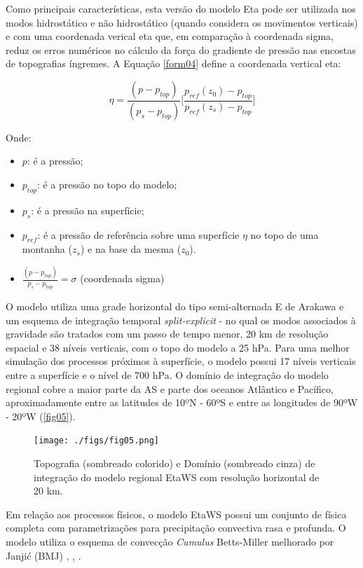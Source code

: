 Como principais características, esta versão do modelo Eta pode ser utilizada nos modos hidrostático e não hidrostático (quando considera os movimentos verticais) e com uma coordenada verical eta que, em comparação à coordenada sigma, reduz os erros numéricos no cálculo da força do gradiente de pressão nas encostas de topografias íngremes. A Equação \autoref{form04} define a coordenada vertical eta:

\begin{equation}
\eta=\frac{(p-p_{top})}{(p_{s}-p_{top})}\bigg[\frac{p_{ref}(z_{0})-p_{top}}{p_{ref}(z_{s})-p_{top}}\bigg]
\label{form04}
\end{equation}

Onde:

\begin{itemize}
\item $p$: é a pressão;
\item $p_{top}$: é a pressão no topo do modelo;
\item $p_{s}$: é a pressão na superfície;
\item $p_{ref}$: é a pressão de referência sobre uma superfície $\eta$ no topo de uma montanha ($z_{s}$) e na base da mesma ($z_{0}$).
\item $\frac{(p-p_{top})}{p_{s}-p_{top}}=\sigma$ (coordenada sigma)
\end{itemize}

O modelo utiliza uma grade horizontal do tipo semi-alternada E de Arakawa \cite{arakawalamb77} e um esquema de integração temporal \textit{split-explicit} - no qual os modos associados à gravidade são tratados com um passo de tempo menor, 20 km de resolução espacial e 38 níveis verticais, com o topo do modelo a 25 hPa. Para uma melhor simulação dos processos próximos à superfície, o modelo possui 17 níveis verticais entre a superfície e o nível de 700 hPa. O domínio de integração do modelo regional cobre a maior parte da AS e parte dos oceanos Atlântico e Pacífico, aproximadamente entre as latitudes de 10ºN - 60ºS e entre as longitudes de 90ºW - 20ºW (\autoref{fig05}). 

\begin{figure}[!hbp]
\centering
\texttt{[image: ./figs/fig05.png]}
\caption{Topografia (sombreado colorido) e Domínio (sombreado cinza) de integração do modelo regional EtaWS com resolução horizontal de 20 km.}
\label{fig07}
\end{figure}

Em relação aos processos físicos, o modelo EtaWS possui um conjunto de física completa com parametrizações para precipitação convectiva rasa e profunda. O modelo utiliza o esquema de convecção \textit{Cumulus} Betts-Miller melhorado por Janjić (BMJ) \cite{betts86}, \cite{bettsmiller86}, \cite{janjic94}. 

